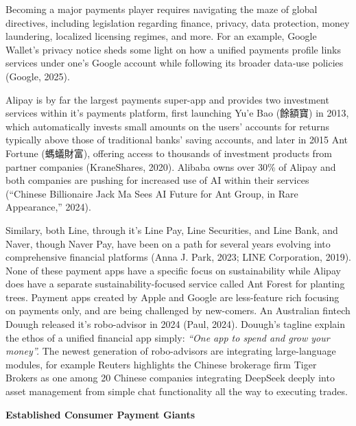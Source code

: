 \documentclass[
  12pt,
  letterpaper,
  DIV=11,
  numbers=noendperiod]{scrartcl}
\begin{document}
\let\pandoctableshortcapt\relax

Becoming a major payments player requires navigating the maze of global
directives, including legislation regarding finance, privacy, data
protection, money laundering, localized licensing regimes, and more. For
an example, Google Wallet's privacy notice sheds some light on how a
unified payments profile links services under one's Google account while
following its broader data‑use policies (Google, 2025).

Alipay is by far the largest payments super-app and provides two
investment services within it's payments platform, first launching Yu'e
Bao (餘額寶) in 2013, which automatically invests small amounts on the
users' accounts for returns typically above those of traditional banks'
saving accounts, and later in 2015 Ant Fortune (螞蟻財富), offering
access to thousands of investment products from partner companies
(KraneShares, 2020). Alibaba owns over 30\% of Alipay and both companies
are pushing for increased use of AI within their services ({``Chinese
Billionaire {Jack Ma} Sees {AI} Future for {Ant Group}, in Rare
Appearance,''} 2024).

Similary, both Line, through it's Line Pay, Line Securities, and Line
Bank, and Naver, though Naver Pay, have been on a path for several years
evolving into comprehensive financial platforms (Anna J. Park, 2023;
LINE Corporation, 2019). None of these payment apps have a specific
focus on sustainability while Alipay does have a separate
sustainability-focused service called Ant Forest for planting trees.
Payment apps created by Apple and Google are less-feature rich focusing
on payments only, and are being challenged by new-comers. An Australian
fintech Douugh released it's robo-advisor in 2024 (Paul, 2024). Douugh's
tagline explain the ethos of a unified financial app simply: \emph{``One
app to spend and grow your money''.} The newest generation of
robo-advisors are integrating large-language modules, for example
Reuters highlights the Chinese brokerage firm Tiger Brokers as one among
20 Chinese companies integrating DeepSeek deeply into asset management
from simple chat functionality all the way to executing trades.

\textbf{Established Consumer Payment Giants}

\def\pandoctableshortcapt{Consumer Payment Giants}
\end{document}
